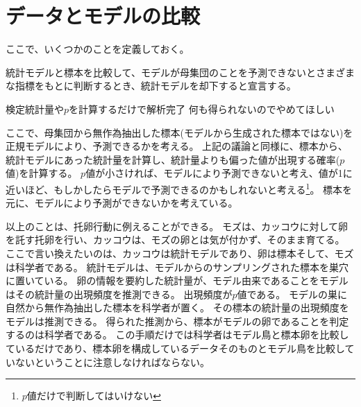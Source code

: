 \section{データとモデルの比較}
ここで、いくつかのことを定義しておく。
\begin{defi}
    統計モデルと標本を比較して、モデルが母集団のことを予測できないとさまざまな指標をもとに判断するとき、統計モデルを却下すると宣言する。
\end{defi}

\begin{SMbox}{検定統計量や$p$を計算するだけで解析完了}
    何も得られないのでやめてほしい
\end{SMbox}


ここで、母集団から無作為抽出した標本(モデルから生成された標本ではない)を正規モデルにより、予測できるかを考える。
上記の議論と同様に、標本から、統計モデルにあった統計量を計算し、統計量よりも偏った値が出現する確率($p$値)を計算する。
$p$値が小さければ、モデルにより予測できないと考え、値が1に近いほど、もしかしたらモデルで予測できるのかもしれないと考える\footnote{$p$値だけで判断してはいけない}。
標本を元に、モデルにより予測ができないかを考えている。



以上のことは、托卵行動に例えることができる。
モズは、カッコウに対して卵を託す托卵を行い、カッコウは、モズの卵とは気が付かず、そのまま育てる。
ここで言い換えたいのは、カッコウは統計モデルであり、卵は標本そして、モズは科学者である。
統計モデルは、モデルからのサンプリングされた標本を巣穴に置いている。
卵の情報を要約した統計量が、モデル由来であることをモデルはその統計量の出現頻度を推測できる。
出現頻度が$p$値である。
モデルの巣に自然から無作為抽出した標本を科学者が置く。
その標本の統計量の出現頻度をモデルは推測できる。
得られた推測から、標本がモデルの卵であることを判定するのは科学者である。
この手順だけでは科学者はモデル鳥と標本卵を比較しているだけであり、標本卵を構成しているデータそのものとモデル鳥を比較していないということに注意しなければならない。


